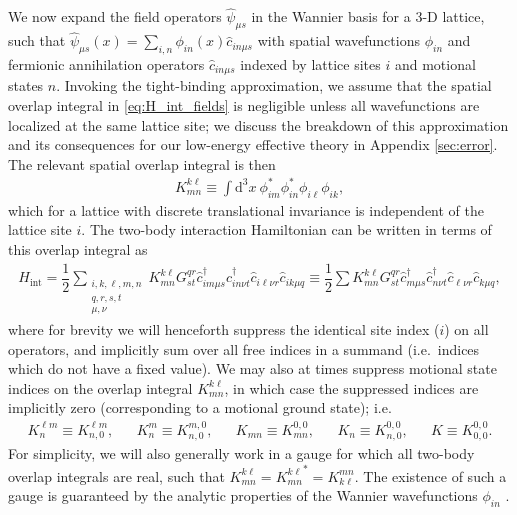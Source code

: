 \documentclass[preprint,showkeys,nofootinbib]{revtex4-1}
\renewcommand{\t}{\text} %
\newcommand{\f}{\dfrac} %
\renewcommand{\d}{\text{d}}
\renewcommand{\c}{\hat{c}}
\newcommand{\1}{\mathds{1}}
\begin{document}
We now expand the field operators $\hat\psi_{\mu s}$ in the Wannier
basis for a 3-D lattice, such that
$\hat\psi_{\mu s}(x) = \sum_{i,n} \phi_{in}(x) \c_{in\mu s}$ with
spatial wavefunctions $\phi_{in}$ and fermionic annihilation operators
$\c_{in\mu s}$ indexed by lattice sites $i$ and motional states $n$.
Invoking the tight-binding approximation, we assume that the spatial
overlap integral in \eqref{eq:H_int_fields} is negligible unless all
wavefunctions are localized at the same lattice site; we discuss the
breakdown of this approximation and its consequences for our
low-energy effective theory in Appendix \ref{sec:error}.  The relevant
spatial overlap integral is then
\begin{align}
  K^{k\ell}_{mn}
  \equiv \int \d^3x~ \phi_{im}^* \phi_{in}^* \phi_{i\ell} \phi_{ik},
  \label{eq:K_klmn}
\end{align}
which for a lattice with discrete translational invariance is
independent of the lattice site $i$.  The two-body interaction
Hamiltonian can be written in terms of this overlap integral as
\begin{align}
  H_{\t{int}}
  = \f12 \sum_{\substack{i,k,\ell,m,n\\q,r,s,t\\\mu,\nu}}
  K^{k\ell}_{mn} G^{qr}_{st}
  \c_{im\mu s}^\dag \c_{in\nu t}^\dag \c_{i\ell\nu r} \c_{ik\mu q}
  \equiv \f12 \sum K^{k\ell}_{mn} G^{qr}_{st}
  \c_{m\mu s}^\dag \c_{n\nu t}^\dag \c_{\ell\nu r} \c_{k\mu q},
  \label{eq:H_int}
\end{align}
where for brevity we will henceforth suppress the identical site index
($i$) on all operators, and implicitly sum over all free indices in a
summand (i.e.~indices which do not have a fixed value).  We may also
at times suppress motional state indices on the overlap integral
$K^{k\ell}_{mn}$, in which case the suppressed indices are implicitly
zero (corresponding to a motional ground state); i.e.
\begin{align}
  K^{\ell m}_n \equiv K^{\ell m}_{n,0},
  &&
  K^m_n \equiv K^{m,0}_{n,0},
  &&
  K_{mn} \equiv K^{0,0}_{mn},
  &&
  K_n \equiv K^{0,0}_{n,0},
  &&
  K \equiv K^{0,0}_{0,0}.
  \label{eq:K}
\end{align}
For simplicity, we will also generally work in a gauge for which all
two-body overlap integrals are real, such that
$K^{k\ell}_{mn}={K^{k\ell}_{mn}}^*=K^{mn}_{k\ell}$.  The existence of
such a gauge is guaranteed by the analytic properties of the Wannier
wavefunctions $\phi_{in}$ \cite{kohn1959analytic}.
\end{document}
